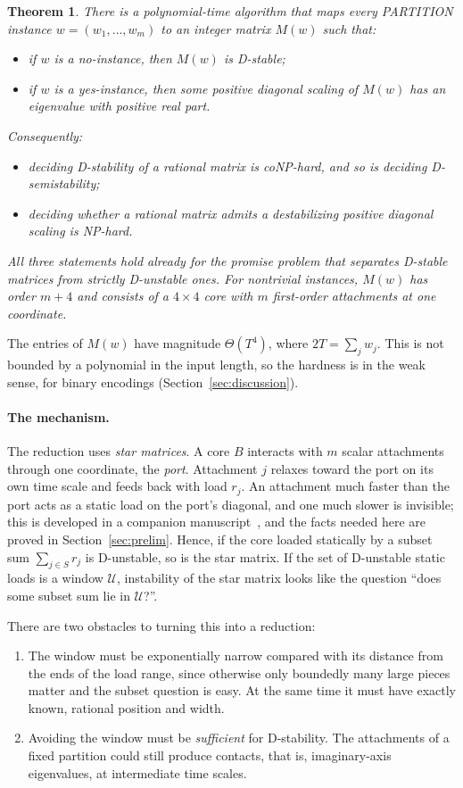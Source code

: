 \documentclass[11pt,a4paper]{article}
\theoremstyle{plain}
\newtheorem*{mainthm}{Theorem}
\theoremstyle{definition}
\theoremstyle{remark}
\newcommand{\cU}{\mathcal{U}}
\begin{document}
\begin{mainthm}
There is a polynomial-time algorithm that maps every PARTITION instance
$w=(w_1,\dots,w_m)$ to an integer matrix $M(w)$ such that:
\begin{itemize}
\item if $w$ is a no-instance, then $M(w)$ is D-stable;
\item if $w$ is a yes-instance, then some positive diagonal scaling of $M(w)$ has an
eigenvalue with positive real part.
\end{itemize}
Consequently:
\begin{itemize}
\item deciding D-stability of a rational matrix is coNP-hard, and so is deciding
D-semistability;
\item deciding whether a rational matrix admits a destabilizing positive diagonal
scaling is NP-hard.
\end{itemize}
All three statements hold already for the promise problem that separates D-stable
matrices from strictly D-unstable ones. For nontrivial instances, $M(w)$ has order
$m+4$ and consists of a $4\times4$ core with $m$ first-order attachments at one
coordinate.
\end{mainthm}

The entries of $M(w)$ have magnitude $\Theta(T^4)$, where $2T=\sum_jw_j$. This is not
bounded by a polynomial in the input length, so the hardness is in the weak sense, for
binary encodings (Section~\ref{sec:discussion}).

\paragraph{The mechanism.}
The reduction uses \emph{star matrices}. A core $B$ interacts with $m$ scalar
attachments through one coordinate, the \emph{port}. Attachment $j$ relaxes toward the
port on its own time scale and feeds back with load $r_j$. An attachment much faster than
the port acts as a static load on the port's diagonal, and one much slower is invisible;
this is developed in a companion manuscript~\cite{companion2026}, and the facts needed
here are proved in Section~\ref{sec:prelim}. Hence, if the
core loaded statically by a subset sum $\sum_{j\in S}r_j$ is D-unstable, so is the star
matrix. If the set of D-unstable static loads is a window $\cU$, instability of the
star matrix looks like the question ``does some subset sum lie in $\cU$?''.

There are two obstacles to turning this into a reduction:
\begin{enumerate}[label=(\roman*)]
\item The window must be exponentially narrow compared with its distance from the
ends of the load range, since otherwise only boundedly many large pieces matter and
the subset question is easy. At the same time it must have exactly known, rational
position and width.
\item Avoiding the window must be \emph{sufficient} for D-stability. The attachments
of a fixed partition could still produce contacts, that is, imaginary-axis
eigenvalues, at intermediate time scales.
\end{enumerate}
\end{document}
